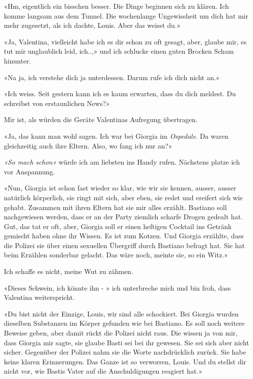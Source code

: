 «Hm, eigentlich ein bisschen besser. Die Dinge beginnen sich zu klären.
Ich komme langsam aus dem Tunnel. Die wochenlange Ungewissheit um dich
hat mir mehr zugesetzt, als ich dachte, Louis. Aber das weisst du.»

«Ja, Valentina, vielleicht habe ich es dir schon zu oft gesagt, aber,
glaube mir, es tut mir unglaublich leid, ich..,» und ich schlucke einen
guten Brocken Scham hinunter.

«Na ja, ich verstehe dich ja unterdessen. Darum rufe ich dich nicht an.»

«Ich weiss. Seit gestern kann ich es kaum erwarten, dass du dich
meldest. Du schreibst von erstaunlichen News?»

Mir ist, als würden die Geräte Valentinas Aufregung übertragen.

«Ja, das kann man wohl sagen. Ich war bei Giorgia im \emph{Ospedale}. Da
waren gleichzeitig auch ihre Eltern. Also, wo fang ich nur an?»

\emph{«So mach schon»} würde ich am liebsten ins Handy rufen. Nächstens
platze ich vor Anspannung.

«Nun, Giorgia ist schon fast wieder so klar, wie wir sie kennen, ausser,
ausser natürlich körperlich, sie ringt mit sich, aber eben, sie redet
und ereifert sich wie gehabt. Zusammen mit ihren Eltern hat sie mir
alles erzählt. Bastiano soll nachgewiesen werden, dass er an der Party
ziemlich scharfe Drogen gedealt hat. Gut, das tat er oft, aber, Giorgia
soll er einen heftigen Cocktail ins Getränk gemischt haben ohne ihr
Wissen. Es ist zum Kotzen. Und Giorgia erzählte, dass die Polizei sie
über einen sexuellen Übergriff durch Bastiano befragt hat. Sie hat beim
Erzählen sonderbar gelacht. Das wäre noch, meinte sie, so ein Witz.»

Ich schaffe es nicht, meine Wut zu zähmen.

«Dieses Schwein, ich könnte ihn - » ich unterbreche mich und bin froh,
dass Valentina weiterspricht.

«Du bist nicht der Einzige, Louis, wir sind alle schockiert. Bei Giorgia
wurden dieselben Substanzen im Körper gefunden wie bei Bastiano. Es soll
noch weitere Beweise geben, aber damit rückt die Polizei nicht raus. Die
wissen ja von mir, dass Giorgia mir sagte, sie glaube Basti sei bei ihr
gewesen. Sie sei sich aber nicht sicher. Gegenüber der Polizei nahm sie
die Worte nachdrücklich zurück. Sie habe keine klaren Erinnerungen. Das
Ganze ist so verworren, Louis. Und du stellst dir nicht vor, wie Bastis
Vater auf die Anschuldigungen reagiert hat.»

